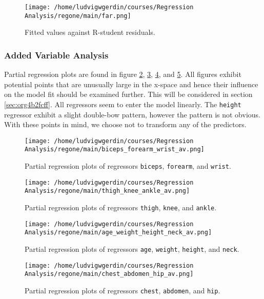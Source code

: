 \documentclass[11pt]{article}
\begin{document}
\begin{figure}[htbp]
\centering
\texttt{[image: /home/ludvigwgerdin/courses/Regression Analysis/regone/main/far.png]}
\caption{\label{fig:orgb3ff42f}
Fitted values against R-student residuals.}
\end{figure}

\subsubsection{Added Variable Analysis}
\label{sec:org3f34b22}

Partial regression plots are found in figure \ref{fig:org6d39285}, \ref{fig:org32efb55},
\ref{fig:org92c8132}, and \ref{fig:org4b971c0}. All figures exhibit potential points 
that are unusually large in the x-space and hence their influence on the model fit should be 
examined further. This will be considered in section \ref{sec:org4b2fcff}. All regressors
seem to enter the model linearly. The \texttt{height} regressor exhibit a slight double-bow pattern, however
the pattern is not obvious. With these points in mind, we choose not to transform any of the 
predictors.

\begin{figure}[htbp]
\centering
\texttt{[image: /home/ludvigwgerdin/courses/Regression Analysis/regone/main/biceps\_forearm\_wrist\_av.png]}
\caption{\label{fig:org6d39285}
Partial regression plots of regressors \texttt{biceps}, \texttt{forearm}, and \texttt{wrist}.}
\end{figure}   

\begin{figure}[htbp]
\centering
\texttt{[image: /home/ludvigwgerdin/courses/Regression Analysis/regone/main/thigh\_knee\_ankle\_av.png]}
\caption{\label{fig:org32efb55}
Partial regression plots of regressors \texttt{thigh}, \texttt{knee}, and \texttt{ankle}.}
\end{figure}

\begin{figure}[htbp]
\centering
\texttt{[image: /home/ludvigwgerdin/courses/Regression Analysis/regone/main/age\_weight\_height\_neck\_av.png]}
\caption{\label{fig:org92c8132}
Partial regression plots of regressors \texttt{age}, \texttt{weight}, \texttt{height}, and \texttt{neck}.}
\end{figure}

\begin{figure}[htbp]
\centering
\texttt{[image: /home/ludvigwgerdin/courses/Regression Analysis/regone/main/chest\_abdomen\_hip\_av.png]}
\caption{\label{fig:org4b971c0}
Partial regression plots of regressors \texttt{chest}, \texttt{abdomen}, and \texttt{hip}.}
\end{figure}
\end{document}
